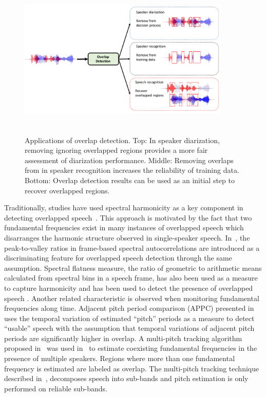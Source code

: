 \begin{figure}[t!]
	\centering
	\vspace{0mm}
	\includegraphics[height = 3in, width=0.9\textwidth]{figures/overlap_detection_applications}
	\vspace{-3mm}
	\caption{Applications of overlap detection. 
	Top: In speaker diarization, removing ignoring overlapped regions provides a more fair assessment of diarization performance. 
	Middle: Removing overlaps from in speaker recognition increases the reliability of training data.
	Bottom: Overlap detection results can be used as an initial step to recover overlapped regions.}
	\label{fig:pykno_blockdiag}
	\vspace{-3mm}
\end{figure}



Traditionally, studies have used spectral harmonicity as a key component in detecting overlapped speech~\cite{nav_icassp13,smolenski_tut}. 
This approach is motivated by the fact that two fundamental frequencies exist in many instances of overlapped speech which disarranges the harmonic structure observed in single-speaker speech. 
In~\cite{sapvr_2000}, the peak-to-valley ratios in frame-based spectral autocorrelations are introduced as a discriminating feature for overlapped speech detection through the same assumption. 
Spectral flatness measure, the ratio of geometric to arithmetic means calculated from spectral bins in a speech frame, has also been used as a measure to capture harmonicity and has been used to detect the presence of overlapped speech \cite{nav_icassp13}. 
Another related characteristic is observed when monitoring fundamental frequencies along time. 
Adjacent pitch period comparison (APPC) presented in~\cite{appc2001} uses the temporal variation of estimated ``pitch'' periods as a measure to detect ``usable'' speech with the assumption that temporal variations of adjacent pitch periods are significantly higher in overlap. 
A multi-pitch tracking algorithm proposed in~\cite{Dwang_03_trans} was used in~\cite{Dwang_03} to estimate coexisting fundamental frequencies in the presence of multiple speakers. 
Regions where more than one fundamental frequency is estimated are labeled as overlap. 
The multi-pitch tracking technique described in~\cite{Dwang_03_trans}, decomposes speech into sub-bands and pitch estimation is only performed on reliable sub-bands. 

